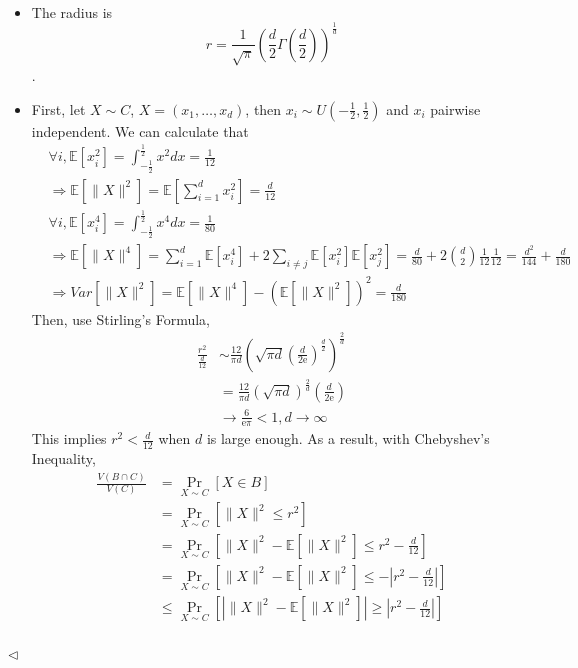 \documentclass[11pt]{article}
\newenvironment{answer}[1][Answer]{\begin{trivlist}
\item[\hskip \labelsep {\bfseries #1.}\hskip \labelsep]}{\hfill$\lhd$\end{trivlist}}
\newcommand\E{\mathbb{E}}
\begin{document}
\begin{answer} ~
    \begin{itemize}
        \item[(1)] The radius is \[r = \frac{1}{\sqrt{\pi}}\left(\frac{d}{2}\Gamma\left(\frac{d}{2}\right)\right)^\frac{1}{d}\].
        \item[(2)] First, let $X \sim C$, $X = (x_1, \dots, x_d)$, then $x_i \sim U(-\frac{1}{2}, \frac{1}{2})$ and $x_i$ pairwise independent. We can calculate that
        \begin{align*}
            &\forall i, \E[x_i^2] = \int_{-\frac{1}{2}}^{\frac{1}{2}} x^2 dx = \frac{1}{12} \\
            &\Rightarrow \E[\|X\|^2] = \E\left[\sum_{i=1}^d x_i^2\right] = \frac{d}{12} \\
            &\forall i, \E[x_i^4] = \int_{-\frac{1}{2}}^{\frac{1}{2}} x^4 dx = \frac{1}{80} \\
            &\Rightarrow \E[\|X\|^4] = \sum_{i=1}^d \E[x_i^4] + 2\sum_{i\neq j} \E[x_i^2]\E[x_j^2] = \frac{d}{80} + 2\binom{d}{2} \frac{1}{12} \frac{1}{12} = \frac{d^2}{144} + \frac{d}{180} \\
            &\Rightarrow Var[\|X\|^2] = \E[\|X\|^4] - (\E[\|X\|^2])^2 = \frac{d}{180} 
        \end{align*}
        Then, use Stirling's Formula, 
        \begin{align*}
            \frac{r^2}{\frac{d}{12}} &\sim \frac{12}{\pi d} \left(\sqrt{\pi d}\left(\frac{d}{2\mathrm{e}}\right)^{\frac{d}{2}}\right)^\frac{2}{d} \\
            &= \frac{12}{\pi d} (\sqrt{\pi d})^\frac{2}{d} \left(\frac{d}{2\mathrm{e}}\right) \\
            &\to \frac{6}{\mathrm{e}\pi} < 1, d \to \infty
        \end{align*}
        This implies $r^2 < \frac{d}{12}$ when $d$ is large enough. As a result, with Chebyshev's Inequality,
        \begin{align*}
            \frac{V(B \cap C)}{V(C)} &= \Pr_{X \sim C}[X \in B] \\
            &= \Pr_{X \sim C}\left[\|X\|^2 \leq r^2\right] \\
            &= \Pr_{X \sim C}\left[\|X\|^2 - \E[\|X\|^2] \le r^2 - \frac{d}{12}\right] \\
            &= \Pr_{X \sim C}\left[\|X\|^2 - \E[\|X\|^2] \le -\left|r^2 - \frac{d}{12}\right|\right] \\
            &\le \Pr_{X \sim C}\left[\left|\|X\|^2 - \E[\|X\|^2]\right| \ge \left|r^2 - \frac{d}{12}\right|\right] \\

\end{align*}
\end{itemize}
\end{answer}
\end{document}
